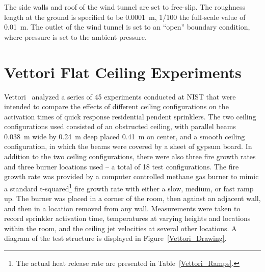 The side walls and roof of the wind tunnel are set to free-slip. The roughness length at the ground is specified to be 0.0001~m, 1/100 the full-scale value of 0.01~m. The outlet of the wind tunnel is set to an ``open'' boundary condition, where pressure is set to the ambient pressure.


\section{Vettori Flat Ceiling Experiments}
\label{Vettori_Flat_Ceiling_Description}

Vettori~\cite{Vettori:1} analyzed a series of 45 experiments conducted at NIST that were intended to compare the effects of different ceiling configurations on the activation times of quick response residential pendent sprinklers. The two ceiling configurations used consisted of an obstructed ceiling, with parallel beams 0.038~m wide by 0.24~m deep placed 0.41~m on center, and a smooth ceiling configuration, in which the beams were covered by a sheet of gypsum board.  In addition to the two ceiling configurations, there were also three fire growth rates and three burner locations used -- a total of 18 test configurations. The fire growth rate was provided by a computer controlled methane gas burner to mimic a standard t-squared\footnote{The actual heat release rate are presented in Table~\ref{Vettori_Ramps}.} fire growth rate with either a slow, medium, or fast ramp up. The burner was placed in a corner of the room, then against an adjacent wall, and then in a location removed from any wall. Measurements were taken to record sprinkler activation time, temperatures at varying heights and locations within the room, and the ceiling jet velocities at several other locations.  A diagram of the test structure is displayed in Figure~\ref{Vettori_Drawing}.

